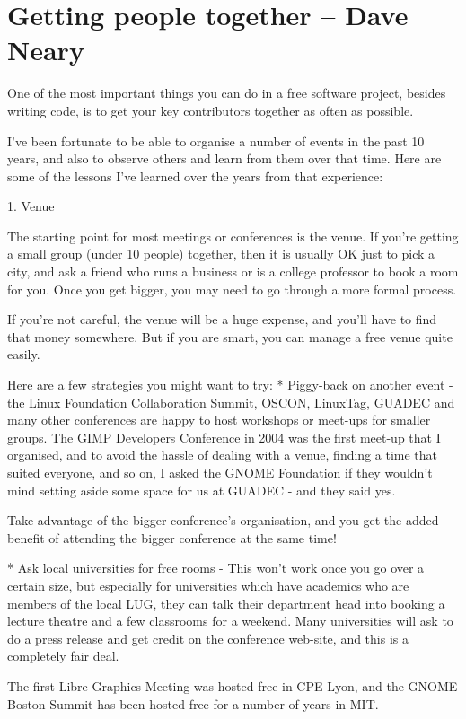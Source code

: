 \chapter{Getting people together -- Dave Neary }

One of the most important things you can do in a free software project,
besides writing code, is to get your key contributors together as often
as possible.

I've been fortunate to be able to organise a number of events in the
past 10 years, and also to observe others and learn from them over that
time. Here are some of the lessons I've learned over the years from that
experience:

1. Venue

The starting point for most meetings or conferences is the venue. If
you're getting a small group (under 10 people) together, then it is
usually OK just to pick a city, and ask a friend who runs a business or
is a college professor to book a room for you. Once you get bigger, you
may need to go through a more formal process.

If you're not careful, the venue will be a huge expense, and you'll have
to find that money somewhere. But if you are smart, you can manage a
free venue quite easily.

Here are a few strategies you might want to try:
       * Piggy-back on another event - the Linux Foundation Collaboration
Summit, OSCON, LinuxTag, GUADEC and many other conferences are happy to
host workshops or meet-ups for smaller groups. The GIMP Developers
Conference in 2004 was the first meet-up that I organised, and to avoid
the hassle of dealing with a venue, finding a time that suited everyone,
and so on, I asked the GNOME Foundation if they wouldn't mind setting
aside some space for us at GUADEC - and they said yes.

       Take advantage of the bigger conference's organisation, and you get the
added benefit of attending the bigger conference at the same time!

       * Ask local universities for free rooms - This won't work once you go
over a certain size, but especially for universities which have
academics who are members of the local LUG, they can talk their
department head into booking a lecture theatre and a few classrooms for a
weekend. Many universities will ask to do a press release and get credit
on the conference web-site, and this is a completely fair deal.

       The first Libre Graphics Meeting was hosted free in CPE Lyon, and the
GNOME Boston Summit has been hosted free for a number of years in MIT.

